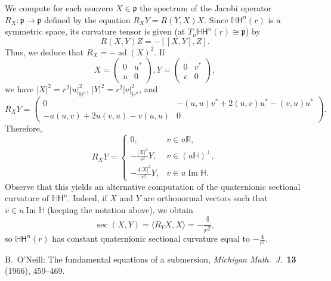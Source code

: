 \documentclass[12pt, a4paper]{amsart}
\newcommand{\g}{\mathfrak}
\newcommand{\R}{\mathbb{R}}
\renewcommand{\H}{\mathbb{H}}
\theoremstyle{remark}
\begin{document}
We compute for each nonzero $X\in \g{p}$ the spectrum of the Jacobi operator $R_{X}\colon \g{p}\to \g{p}$ defined by the equation $R_{X}Y=R(Y,X)X$.
Since $\H\mathsf{H}^{n}(r)$ is a symmetric space, its curvature tensor is given (at $T_{o}\H\mathsf{H}^{n}(r)\cong \g{p}$) by
\begin{equation*}
	R(X,Y)Z=-[[X,Y],Z].
\end{equation*}
Thus, we deduce that $R_{X}=-\operatorname{ad}(X)^{2}$.
If
\[
X=\left(
\begin{array}{c|c}
	0 & u^{*} \\
	\hline
	u & 0
\end{array}
\right),
Y=\left(
\begin{array}{c|c}
	0 & v^{*} \\
	\hline
	v & 0
\end{array}
\right),
\]
we have $\lvert X\rvert^{2}=r^{2}\lvert u \rvert^{2}_{\H^{n}}$, $\lvert Y\rvert^{2}=r^{2}\lvert v \rvert^{2}_{\H^{n}}$, and
\[
	R_{X}Y=\left(
	\begin{array}{c|c}
		0 & -(u,u)v^{*}+2(u,v)u^{*}-(v,u)u^{*} \\
		\hline
		-u(u,v)+2u(v,u)-v(u,u) & 0
	\end{array}
	\right).
\]
Therefore,
\[
	R_{X}Y=
	\begin{cases}
		0, & v\in u\R, \\
		-\frac{\lvert X \rvert^{2}}{r^{2}}Y, & v\in (u\H)^{\perp}, \\
		-\frac{4 \lvert X \rvert^{2}}{r^{2}} Y, & v\in u\operatorname{Im}\H.
	\end{cases}
\]
Observe that this yields an alternative computation of the quaternionic sectional curvature of $\H\mathsf{H}^{n}$.
Indeed, if $X$ and $Y$ are orthonormal vectors such that $v\in u \operatorname{Im}\H$ (keeping the notation above), we obtain
\[
	\operatorname{sec}(X,Y)=\langle R_{Y}X,X \rangle=-\frac{4}{r^{2}},
\]
so $\H\mathsf{H}^{n}(r)$ has constant quaternionic sectional curvature equal to $-\frac{4}{r^{2}}$.

\begin{thebibliography}{99}
B.~O'Neill: The fundamental equations of a submersion, \textit{Michigan Math.\ J.}\ \textbf{13} (1966), 459--469.
\end{thebibliography}
\end{document}
